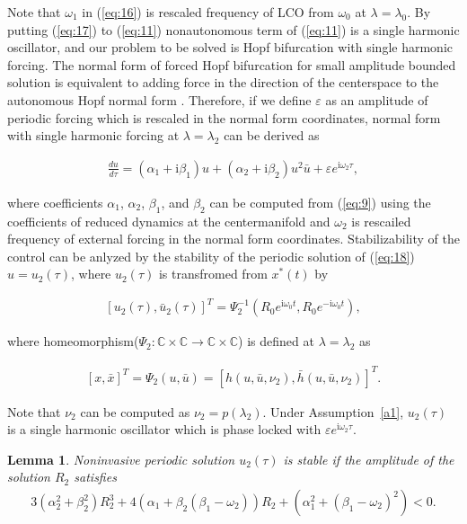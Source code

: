 \documentclass[openacc]{rsproca_new}%
\def\complex{\mathbb{C}}
\def\epsilon{\varepsilon}
\newcommand{\Eref}[1]{(\ref{#1})}
\newcommand{\asref}[1]{Assumption~\ref{#1}}
\newtheorem{lemma}{\bf Lemma}[section]
\begin{document}
\noindent Note that $\omega_1$ in \Eref{eq:16} is rescaled frequency of LCO from $\omega_0$ at $\lambda=\lambda_0$. By putting \Eref{eq:17} to \Eref{eq:11} nonautonomous term of \Eref{eq:11} is a single harmonic oscillator, and our problem to be solved is Hopf bifurcation with single harmonic forcing. The normal form of forced Hopf bifurcation for small amplitude bounded solution is equivalent to adding force in the direction of the centerspace to the autonomous Hopf normal form \cite{golubitsky2012feed,elphick1987normal}. Therefore, if we define $\epsilon$ as an amplitude of periodic forcing which is rescaled in the normal form coordinates, normal form with single harmonic forcing at $\lambda=\lambda_2$ can be derived as

\begin{align}\label{eq:18}
  \frac{du}{d\tau}=(\alpha_1+\textrm{i}\beta_1)u+(\alpha_2+\textrm{i}\beta_2)u^2\bar u+\epsilon e^{\textrm{i}\omega_2\tau},
\end{align}

\noindent where coefficients $\alpha_1$, $\alpha_2$, $\beta_1$, and $\beta_2$ can be computed from \Eref{eq:9} using the coefficients of reduced dynamics at the centermanifold and $\omega_2$ is rescailed frequency of external forcing in the normal form coordinates. Stabilizability of the control can be anlyzed by the stability of the periodic solution of \Eref{eq:18} $u=u_2(\tau)$, where $u_2(\tau)$ is transfromed from $x^*(t)$ by


\begin{align}\label{eq:19}
[u_2(\tau),\bar u_2(\tau)]^T = \Psi_2^{-1}(R_0e^{\textrm{i}\omega_0 t},R_0e^{-\textrm{i}\omega_0 t}),
\end{align}

\noindent where homeomorphism($\Psi_2:\complex\times\complex\rightarrow\complex\times\complex$) is defined at $\lambda=\lambda_2$ as

\begin{align}\label{eq:hm}
[x,\bar x]^T=\Psi_2(u,\bar u)=[h(u,\bar u,\nu_2),\bar h(u,\bar u,\nu_2)]^T.
\end{align}

\noindent Note that $\nu_2$ can be computed as $\nu_2=p(\lambda_2)$. Under \asref{a1}, $u_2(\tau)$ is a single harmonic oscillator which is phase locked with $\epsilon e^{\textrm{i}\omega_2\tau}$.

\begin{lemma}\label{t1}
Noninvasive periodic solution $u_2(\tau)$ is stable if the amplitude of the solution $R_2$ satisfies
\begin{align}\label{eq:20}
3(\alpha_2^2+\beta_2^2)R_2^3+4(\alpha_1+\beta_2(\beta_1-\omega_2))R_2+(\alpha_1^2+(\beta_1-\omega_2)^2)<0.
\end{align}
\end{lemma}
\end{document}
